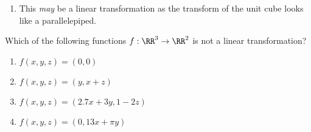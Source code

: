 \begin{example}
\begin{enumerate}
\begin{enumerate}
\item \def\unithousesize{footnotesize}
This \emph{may} be a linear transformation as the transform of the unit cube looks like a parallelepiped. 
\end{enumerate}
\end{enumerate}
\end{example}




\begin{activity}
Which of the following functions \(f:\RR^3\to\RR^2\) is not a linear transformation?
\begin{enumerate}
\item \(f(x,y,z)=(0,0)\)
\item \(f(x,y,z)=(y,x+z)\)
\item \(f(x,y,z)=(2.7x+3y,1-2z)\)
\item \(f(x,y,z)=(0,13x+\pi y)\)
\end{enumerate}
\end{activity}



